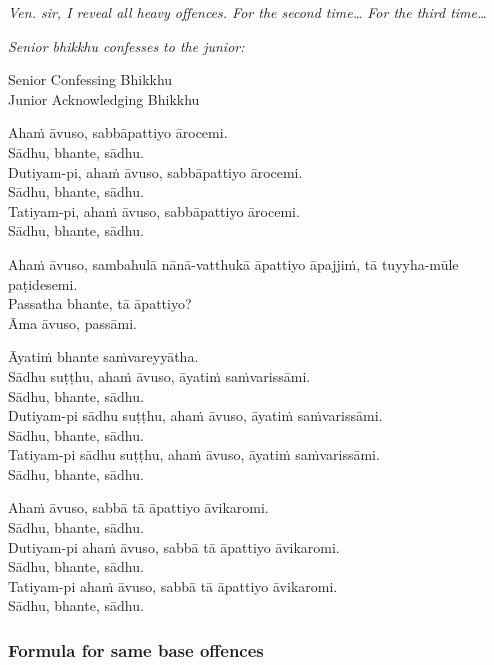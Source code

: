 \emph{Ven. sir, I reveal all heavy offences. For the second time… For the third time…}

\emph{Senior bhikkhu confesses to the junior:}

\vin\vin {} Senior Confessing Bhikkhu\\
\vin\vin {} Junior Acknowledging Bhikkhu

 Ahaṁ āvuso, sabbāpattiyo ārocemi.\\
 Sādhu, bhante, sādhu.\\
 Dutiyam-pi, ahaṁ āvuso, sabbāpattiyo ārocemi.\\
 Sādhu, bhante, sādhu.\\
 Tatiyam-pi, ahaṁ āvuso, sabbāpattiyo ārocemi.\\
 Sādhu, bhante, sādhu.

 Ahaṁ āvuso, sambahulā nānā-vatthukā āpattiyo āpajjiṁ, tā tuyyha-mūle paṭidesemi.\\
 Passatha bhante, tā āpattiyo?\\
 Āma āvuso, passāmi.

 Āyatiṁ bhante saṁvareyyātha.\\
 Sādhu suṭṭhu, ahaṁ āvuso, āyatiṁ saṁvarissāmi.\\
 Sādhu, bhante, sādhu.\\
 Dutiyam-pi sādhu suṭṭhu, ahaṁ āvuso, āyatiṁ saṁvarissāmi.\\
 Sādhu, bhante, sādhu.\\
 Tatiyam-pi sādhu suṭṭhu, ahaṁ āvuso, āyatiṁ saṁvarissāmi.\\
 Sādhu, bhante, sādhu.

 Ahaṁ āvuso, sabbā tā āpattiyo āvikaromi.\\
 Sādhu, bhante, sādhu.\\
 Dutiyam-pi ahaṁ āvuso, sabbā tā āpattiyo āvikaromi.\\
 Sādhu, bhante, sādhu.\\
 Tatiyam-pi ahaṁ āvuso, sabbā tā āpattiyo āvikaromi.\\
 Sādhu, bhante, sādhu.

\subsubsection{Formula for same base offences}

